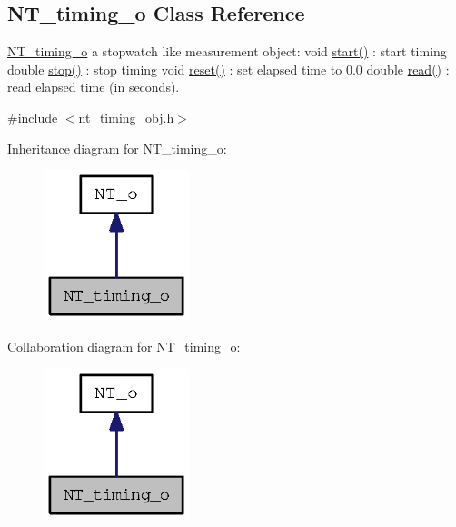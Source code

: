 \subsection{NT\_\-timing\_\-o Class Reference}
\label{class_n_t__timing__o}


\hyperlink{class_n_t__timing__o}{NT\_\-timing\_\-o} a stopwatch like measurement object: void \hyperlink{class_n_t__timing__o_a6f77c3f09d24a4f1351e794d1126142c}{start()} : start timing double \hyperlink{class_n_t__timing__o_aa7b5eb7558cf7afab67dab8aefbbd7ed}{stop()} : stop timing void \hyperlink{class_n_t__timing__o_af7e187132a8caa8c6316ca6f5631e437}{reset()} : set elapsed time to 0.0 double \hyperlink{class_n_t__timing__o_a94c4c21db46fc1972380ec3c9c94f514}{read()} : read elapsed time (in seconds).  




{\ttfamily \#include $<$nt\_\-timing\_\-obj.h$>$}



Inheritance diagram for NT\_\-timing\_\-o:
\nopagebreak
\begin{figure}[H]
\begin{center}
\leavevmode
\includegraphics[width=120pt]{class_n_t__timing__o__inherit__graph}
\end{center}
\end{figure}


Collaboration diagram for NT\_\-timing\_\-o:
\nopagebreak
\begin{figure}[H]
\begin{center}
\leavevmode
\includegraphics[width=120pt]{class_n_t__timing__o__coll__graph}
\end{center}
\end{figure}
